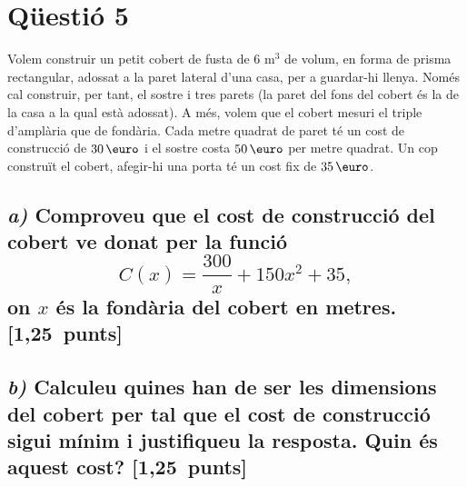 \documentclass[11pt,a4paper]{article}
\begin{document}
\section*{\textcolor{blauPista}{Qüestió 5}}

\noindent Volem construir un petit cobert de fusta de $6 \text{ m}^{3}$ de volum, en forma de prisma rectangular, adossat a la paret lateral d'una casa, per a guardar-hi llenya. Només cal construir, per tant, el sostre i tres parets (la paret del fons del cobert és la de la casa a la qual està adossat). A més, volem que el cobert mesuri el triple d'amplària que de fondària. Cada metre quadrat de paret té un cost de construcció de $30\,\text{\euro}$ i el sostre costa $50\,\text{\euro}$ per metre quadrat. Un cop construït el cobert, afegir-hi una porta té un cost fix de $35\,\text{\euro}$.

\subsection*{\textit{a)} \normalfont Comproveu que el cost de construcció del cobert ve donat per la funció
\[
C(x) = \dfrac{300}{x} + 150x^{2} + 35,
\]
on $x$ és la fondària del cobert en metres. \hfill\textnormal{[1,25~punts]}}


\subsection*{\textit{b)} \normalfont Calculeu quines han de ser les dimensions del cobert per tal que el cost de construcció sigui mínim i justifiqueu la resposta. Quin és aquest cost? \hfill\textnormal{[1,25~punts]}}

\end{document}
